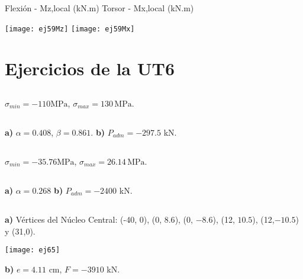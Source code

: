 Flexión - Mz,local (kN.m) \hfill  Torsor - Mx,local (kN.m)

\texttt{[image: ej59Mz]}
\texttt{[image: ej59Mx]}



\section{Ejercicios de la UT6}

\subsection{}
 $\sigma_{min} = -110 \text{MPa}$, $\sigma_{max} = 130 \, \text{MPa}$.


\subsection{}
\textbf{a)} $\alpha = 0.408$, $\beta = 0.861$. 
\textbf{b)} $P_{adm} = -297.5 $ kN.

\subsection{}
$\sigma_{min} = -35.76 \text{MPa}$, $\sigma_{max} = 26.14 \, \text{MPa}$.

\subsection{}
\textbf{a)} $\alpha = 0.268$
\textbf{b)} $P_{adm} = -2400 $ kN.


\subsection{}
\textbf{a)} Vértices del Núcleo Central: (-40, 0), (0, $8.6$), (0, $-8.6$), (12, $10.5$), (12,$-10.5$) y (31,0).

\begin{center}
\texttt{[image: ej65]}
\end{center}

\textbf{b)} $e=4.11$ cm, $F=-3910$ kN.

\subsection{}

